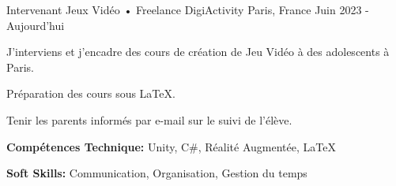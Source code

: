 

\begin{cventries}


    \cventry
    {Intervenant Jeux Vidéo • Freelance} %
    {DigiActivity} %
    {Paris, France} %
    {Juin 2023 - Aujourd'hui} %
    {
      \begin{cvitems} %
        \item {J'interviens et j'encadre des cours de création de Jeu Vidéo à des adolescents à Paris.}
        \item {Préparation des cours sous LaTeX.}
        \item{Tenir les parents informés par e-mail sur le suivi de l'élève.}
        \item {\textbf{Compétences Technique:} Unity, C\#, Réalité Augmentée, LaTeX}
        \item {\textbf{Soft Skills:} Communication, Organisation, Gestion du temps}
      \end{cvitems}
    }


\end{cventries}
